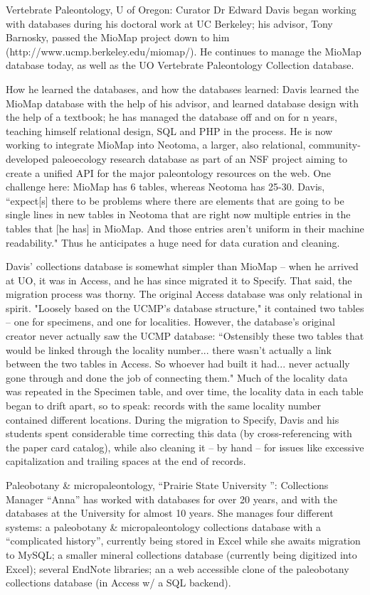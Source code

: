 Vertebrate Paleontology, U of Oregon: Curator Dr Edward Davis began working with databases during his doctoral work at UC Berkeley; his advisor, Tony Barnosky, passed the MioMap project down to him (http://www.ucmp.berkeley.edu/miomap/).  He continues to manage the MioMap database today, as well as the UO Vertebrate Paleontology Collection database.

How he learned the databases, and how the databases learned: Davis learned the MioMap database with the help of his advisor, and learned database design with the help of a textbook; he has managed the database off and on for n years, teaching himself relational design, SQL and PHP in the process.  He is now working to integrate MioMap into Neotoma, a larger, also relational, community-developed paleoecology research database as part of an NSF project aiming to create a unified API for the major paleontology resources on the web.  One challenge here: MioMap has 6 tables, whereas Neotoma has 25-30. Davis, “expect[s] there to be problems where there are elements that are going to be single lines in new tables in Neotoma that are right now multiple entries in the tables that [he has] in MioMap. And those entries aren't uniform in their machine readability."  Thus he anticipates a huge need for data curation and cleaning.

Davis’ collections database is somewhat simpler than MioMap – when he arrived at UO, it was in Access, and he has since migrated it to Specify.  That said, the migration process was thorny.  The original Access database was only relational in spirit.  "Loosely based on the UCMP's database structure," it contained two tables – one for specimens, and one for localities. However, the database’s original creator never actually saw the UCMP database:
“Ostensibly these two tables that would be linked through the locality number... there wasn't actually a link between the two tables in Access. So whoever had built it had... never actually gone through and done the job of connecting them."
Much of the locality data was repeated in the Specimen table, and over time, the locality data in each table began to drift apart, so to speak: records with the same locality number contained different locations.  During the migration to Specify, Davis and his students spent considerable time correcting this data (by cross-referencing with the paper card catalog), while also cleaning it – by hand – for issues like excessive capitalization and trailing spaces at the end of records.  

Paleobotany & micropaleontology, “Prairie State University ”: Collections Manager “Anna” has worked with databases for over 20 years, and with the databases at the University for almost 10 years.  She manages four different systems: a paleobotany & micropaleontology collections database with a “complicated history”, currently being stored in Excel while she awaits migration to MySQL; a smaller mineral collections database (currently being digitized into Excel); several EndNote libraries; an a web accessible clone of the paleobotany collections database (in Access w/ a SQL backend).


